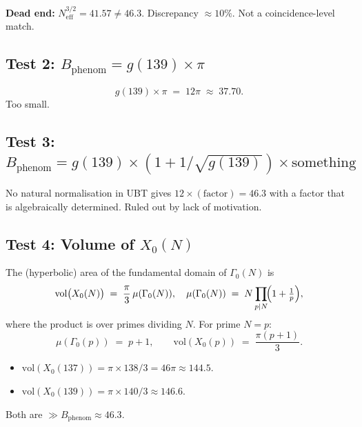 \documentclass[12pt,a4paper]{article}
\theoremstyle{definition}
\theoremstyle{remark}
\begin{document}
\begin{deadendbox}
\textbf{Dead end:} $N_{\mathrm{eff}}^{3/2} = 41.57 \neq 46.3$.
Discrepancy $\approx 10\%$.  Not a coincidence-level match.
\end{deadendbox}

\subsection{Test 2: $B_{\mathrm{phenom}} = g(139) \times \pi$}

\begin{equation}
  g(139) \times \pi \;=\; 12\pi \;\approx\; 37.70.
\end{equation}
Too small.

\subsection{Test 3: $B_{\mathrm{phenom}} = g(139) \times (1 + 1/\sqrt{g(139)}) \times \text{something}$}

No natural normalisation in UBT gives $12 \times (\text{factor}) = 46.3$
with a factor that is algebraically determined.  Ruled out by lack of
motivation.

\subsection{Test 4: Volume of $X_0(N)$}
\label{subsec:volume}

The (hyperbolic) area of the fundamental domain of $\Gamma_0(N)$ is
\begin{equation}
  \mathrm{vol}\bigl(X_0(N)\bigr)
  \;=\; \frac{\pi}{3}\,\mu(\Gamma_0(N)),
  \quad
  \mu(\Gamma_0(N)) \;=\; N\prod_{p\mid N}\!\Bigl(1+\tfrac{1}{p}\Bigr),
\end{equation}
where the product is over primes dividing $N$.  For prime $N = p$:
\begin{equation}
  \mu(\Gamma_0(p)) \;=\; p+1, \qquad
  \mathrm{vol}(X_0(p)) \;=\; \frac{\pi(p+1)}{3}.
\end{equation}

\begin{itemize}
  \item $\mathrm{vol}(X_0(137)) = \pi \times 138/3 = 46\pi \approx 144.5$.
  \item $\mathrm{vol}(X_0(139)) = \pi \times 140/3 \approx 146.6$.
\end{itemize}

Both are $\gg B_{\mathrm{phenom}} \approx 46.3$.
\end{document}
